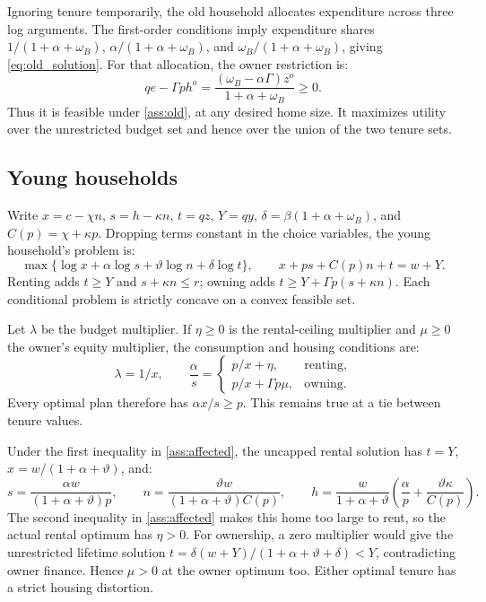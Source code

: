 \documentclass[11pt]{article}
\begin{document}
Ignoring tenure temporarily, the old household allocates expenditure across
three log arguments. The first-order conditions imply expenditure shares
$1/(1+\alpha+\omega_B)$, $\alpha/(1+\alpha+\omega_B)$, and
$\omega_B/(1+\alpha+\omega_B)$, giving \eqref{eq:old_solution}. For
that allocation, the owner restriction is:
\begin{equation}
qe-\Gamma ph^o=\frac{(\omega_B-\alpha\Gamma)z^o}{1+\alpha+\omega_B}\ge0.
\end{equation}
Thus it is feasible under \eqref{ass:old}, at any desired home size. It
maximizes utility over the unrestricted budget set and hence over the union
of the two tenure sets.

\subsection{Young households}

Write $x=c-\chi n$, $s=h-\kappa n$, $t=qz$, $Y=qy$,
$\delta=\beta(1+\alpha+\omega_B)$, and $C(p)=\chi+\kappa p$. Dropping terms constant in the
choice variables, the young household's problem is:
\begin{equation}
\max\{\log x+\alpha\log s+\vartheta\log n+\delta\log t\},
\qquad x+ps+C(p)n+t=w+Y.
\label{eq:appendix_young}
\end{equation}
Renting adds $t\ge Y$ and $s+\kappa n\le r$; owning adds
$t\ge Y+\Gamma p(s+\kappa n)$. Each conditional problem is strictly
concave on a convex feasible set.

Let $\lambda$ be the budget multiplier. If $\eta\ge0$ is the rental-ceiling
multiplier and $\mu\ge0$ the owner's equity multiplier, the consumption
and housing conditions are:
\begin{equation}
\lambda=1/x,\qquad
\frac{\alpha}{s}=\begin{cases}
p/x+\eta,&\text{renting},\\
p/x+\Gamma p\mu,&\text{owning}.
\end{cases}
\label{eq:young_housing_foc}
\end{equation}
Every optimal plan therefore has $\alpha x/s\ge p$. This remains true at
a tie between tenure values.

Under the first inequality in \eqref{ass:affected}, the uncapped rental
solution has $t=Y$, $x=w/(1+\alpha+\vartheta)$, and:
\begin{equation}
s=\frac{\alpha w}{(1+\alpha+\vartheta)p},\qquad
n=\frac{\vartheta w}{(1+\alpha+\vartheta)C(p)},\qquad
h=\frac{w}{1+\alpha+\vartheta}\left(\frac{\alpha}{p}
                    +\frac{\vartheta\kappa}{C(p)}\right).
\end{equation}
The second inequality in \eqref{ass:affected} makes this home too large to
rent, so the actual rental optimum has $\eta>0$. For ownership, a zero
multiplier would give the unrestricted lifetime solution
$t=\delta(w+Y)/(1+\alpha+\vartheta+\delta)<Y$, contradicting owner finance. Hence
$\mu>0$ at the owner optimum too. Either optimal tenure has a strict
housing distortion.
\end{document}
